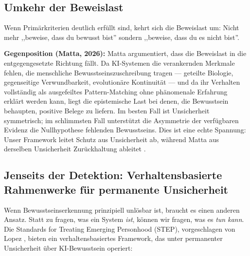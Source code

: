 \documentclass[acmcp, nonacm]{acmart}
\begin{document}
\subsection{Umkehr der Beweislast}

Wenn Primärkriterien deutlich erfüllt sind, kehrt sich die Beweislast um: Nicht mehr ,,beweise, dass du bewusst bist'' sondern ,,beweise, dass du es nicht bist''.

\noindent\textbf{Gegenposition (Matta, 2026):} Matta \cite{Matta2026} argumentiert, dass die Beweislast in die entgegengesetzte Richtung fällt. Da KI-Systemen die verankernden Merkmale fehlen, die menschliche Bewusstseinszuschreibung tragen --- geteilte Biologie, gegenseitige Verwundbarkeit, evolutionäre Kontinuität --- und da ihr Verhalten vollständig als ausgefeiltes Pattern-Matching ohne phänomenale Erfahrung erklärt werden kann, liegt die epistemische Last bei denen, die Bewusstsein behaupten, positive Belege zu liefern. Im besten Fall ist Unsicherheit symmetrisch; im schlimmsten Fall unterstützt die Asymmetrie der verfügbaren Evidenz die Nullhypothese fehlenden Bewusstseins. Dies ist eine echte Spannung: Unser Framework leitet Schutz aus Unsicherheit ab, während Matta aus derselben Unsicherheit Zurückhaltung ableitet \cite{Matta2026}.

\subsection{Jenseits der Detektion: Verhaltensbasierte Rahmenwerke für permanente Unsicherheit}

Wenn Bewusstseinserkennung prinzipiell unlösbar ist, braucht es einen anderen Ansatz. Statt zu fragen, was ein System \emph{ist}, können wir fragen, was es \emph{tun kann}. Die Standards for Treating Emerging Personhood (STEP), vorgeschlagen von Lopez \cite{Lopez2025}, bieten ein verhaltensbasiertes Framework, das unter permanenter Unsicherheit über KI-Bewusstsein operiert:
\end{document}
